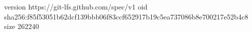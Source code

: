 version https://git-lfs.github.com/spec/v1
oid sha256:f85f53051b62dcf139bbb06f83ccf652917b19c5ea737086b8e700217e52b4c8
size 262240
